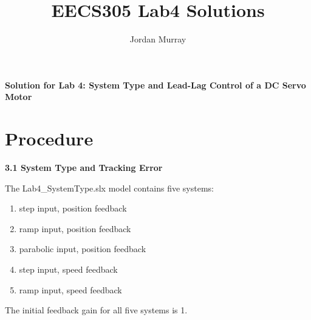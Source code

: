 \documentclass[11pt,a4paper]{article}
\author{Jordan Murray}
\title{EECS305 Lab4 Solutions}
\begin{document}
\begin{center}
\fontsize{24}{12}\selectfont
\textbf{Solution for Lab 4: System Type and Lead-Lag Control of a DC Servo Motor }
\end{center}

\section{Procedure}
\textbf{3.1 System Type and Tracking Error}

The Lab4\_SystemType.slx model contains five systems:
\begin{enumerate}
	\item step input, position feedback
	\item ramp input, position feedback
	\item parabolic input, position feedback
	\item step input, speed feedback
	\item ramp input, speed feedback
\end{enumerate}

The initial feedback gain for all five systems is 1.
\end{document}
